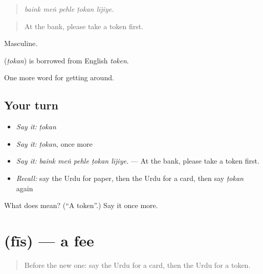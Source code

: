 \begin{quote}
    
\end{quote}

\begin{quote}
\emph{baink meṅ pehle ṭokan lījiye.}
\end{quote}

\begin{quote}
At the bank, please take a token first.
\end{quote}

Masculine.

\begin{cousinweb}
\textbf{} (\emph{ṭokan}) is borrowed from English \emph{token}.
\end{cousinweb}

\begin{grammarlens}[title={What you've built}]
One more word for getting around.
\end{grammarlens}

\subsection*{Your turn}
\begin{itemize}
\raggedright
  \item \emph{Say it:} \emph{ṭokan}
  \item \emph{Say it:} \emph{ṭokan}, once more
  \item \emph{Say it:} \emph{baink meṅ pehle ṭokan lījiye.} — At the bank, please take a token first.
  \item \emph{Recall:} say the Urdu for paper, then the Urdu for a card, then say \emph{ṭokan} again
\end{itemize}

\begin{tcolorbox}[breakable,colback=teal!4,colframe=teal!35!black,title={Before you move on}]
What does  mean? (\textquotedblleft{}A token\textquotedblright{}.) Say it once more.
\end{tcolorbox}
\section[\texorpdfstring{\ur{فیس} (fīs)}{فیس (fīs)}]{ (fīs) — a fee}

\label{lesson:UR-C421-fis}



\begin{quote}
Before the new one: say the Urdu for a card, then the Urdu for a token.
\end{quote}

